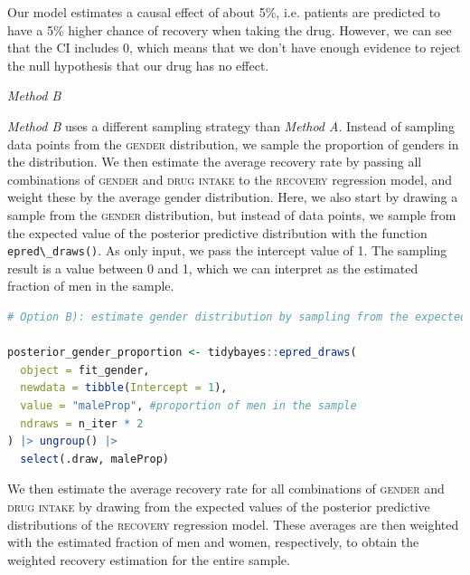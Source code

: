 \documentclass[nobib]{tufte-handout}
\newcommand{\ri}[1]{\mbox{\lstinline{#1}}\xspace}  %
\begin{document}
\vspace{-0.5cm}
Our model estimates a causal effect of about 5\%, i.e. patients are predicted to have a 5\% higher chance of recovery when taking the drug.
However, we can see that the CI includes 0, which means that we don't have enough evidence to reject the null hypothesis that our drug has no effect. 

\emph{Method B}

\emph{Method B} uses a different sampling strategy than \emph{Method A}. 
Instead of sampling data points from the \textsc{gender} distribution, we sample the proportion of genders in the distribution. We then estimate the average recovery rate by passing all combinations of \textsc{gender} and \textsc{drug intake} to the \textsc{recovery} regression model, and weight these by the average gender distribution.
Here, we also start by drawing a sample from the \textsc{gender} distribution, but instead of data points, we sample from the expected value of the posterior predictive distribution with the function \ri{epred\_draws()}.
As only input, we pass the intercept value of 1.
The sampling result is a value between 0 and 1, which we can interpret as the estimated fraction of men in the sample.

\begin{minipage}[]{\textwidth}
\begin{lstlisting}[language=R]
# Option B): estimate gender distribution by sampling from the expected value of the posterior predictive distribution

posterior_gender_proportion <- tidybayes::epred_draws(
  object = fit_gender,
  newdata = tibble(Intercept = 1),
  value = "maleProp", #proportion of men in the sample
  ndraws = n_iter * 2
) |> ungroup() |> 
  select(.draw, maleProp)
\end{lstlisting}
\end{minipage}

\vspace{-0.5cm}
We then estimate the average recovery rate for all combinations of \textsc{gender} and \textsc{drug intake} by drawing from the expected values of the posterior predictive distributions of the \textsc{recovery} regression model. 
These averages are then weighted with the estimated fraction of men and women, respectively, to obtain the weighted recovery estimation for the entire sample. 
\end{document}
